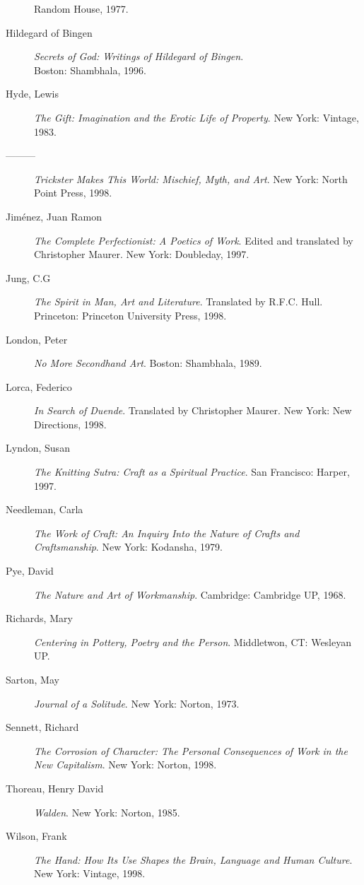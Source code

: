 \documentclass[10pt,DIV09,letterpaper,oneside,headsepline]{scrreprt}
\begin{document}
\begin{description}
Random House, 1977.
\item [Hildegard of Bingen] \textit{Secrets of God: Writings of
Hildegard of Bingen}.\\ Boston: Shambhala, 1996.
\item [Hyde, Lewis] \textit{The Gift: Imagination and the Erotic Life
of Property}. New York: Vintage, 1983.
\item [---------] \textit{Trickster Makes This World: Mischief, Myth,
and Art}. New York: North Point Press, 1998.
\item [Jim\'enez, Juan Ramon] \textit{The Complete Perfectionist: A
Poetics of Work}. Edited and translated by Christopher Maurer. New
York: Doubleday, 1997.
\item [Jung, C.G] \textit{The Spirit in Man, Art and Literature}.
Translated by R.F.C. Hull. Princeton: Princeton University Press,
1998.
\item [London, Peter] \textit{No More Secondhand Art}. Boston:
Shambhala, 1989.
\item [Lorca, Federico] \textit{In Search of Duende}. Translated by
Christopher Maurer. New York: New Directions, 1998.
\item [Lyndon, Susan] \textit{The Knitting Sutra: Craft as a Spiritual
Practice}. San Francisco: Harper, 1997.
\item [Needleman, Carla] \textit{The Work of Craft: An Inquiry Into
the Nature of Crafts and Craftsmanship}. New York: Kodansha, 1979.
\item [Pye, David] \textit{The Nature and Art of Workmanship}.
Cambridge: Cambridge UP, 1968.
\item [Richards, Mary] \textit{Centering in Pottery, Poetry and the
Person}. Middletwon, CT: Wesleyan UP.
\item [Sarton, May] \textit{Journal of a Solitude}. New York: Norton,
1973.
\item [Sennett, Richard] \textit{The Corrosion of Character: The
Personal Consequences of Work in the New Capitalism}. New York:
Norton, 1998.
\item [Thoreau, Henry David] \textit{Walden}. New York: Norton, 1985.
\item [Wilson, Frank] \textit{The Hand: How Its Use Shapes the Brain,
Language and Human Culture}. New York: Vintage, 1998.
\end{description}
\end{document}
